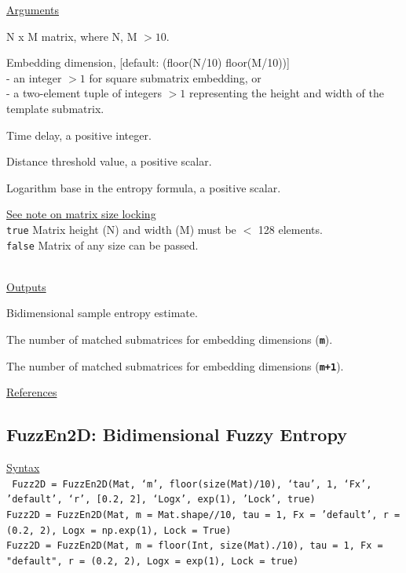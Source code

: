 \documentclass[12pt, a4paper, titlepage, openany]{book}
\begin{document}
\noindent \ul{Arguments}
\begin{description}[labelsep=1cm, labelwidth=2cm, nosep,,style=multiline,leftmargin=3cm]\footnotesize
\item[\texttt{Mat}]		N x M matrix,  where N, M $> 10$.
\item[\texttt{m}]		Embedding dimension, [default: (floor(N/10) floor(M/10))]\\
						- an integer $> 1$ for square submatrix embedding, or\\
						- a two-element tuple of integers $> 1$ representing the height and width of the template submatrix.
\item[\texttt{tau}]		Time delay, a positive integer.
\item[\texttt{r}]		Distance threshold value, a positive scalar.
\item[\texttt{Logx}]	Logarithm base in the entropy formula, a positive scalar.
\item[\texttt{Lock}]	\hyperlink{bidinote}{\ul{See note on matrix size locking}}\\
					\texttt{true} \hspace{15pt} Matrix height (N) and width (M) must be $<$ 128 elements.\\
					\texttt{false}\hspace{12pt} Matrix of any size can be passed.\\ \
\end{description}

\noindent \ul{Outputs}
\begin{description}[labelsep=1cm, labelwidth=2cm, nosep, style=multiline,leftmargin=3cm]\footnotesize
\item[\texttt{SE2D}]		Bidimensional sample entropy estimate.
\item[\texttt{Phi1}]		The number of matched submatrices for embedding dimensions (\texttt{\textbf{m}}).
\item[\texttt{Phi2}]		The number of matched submatrices for embedding dimensions (\texttt{\textbf{m+1}}).
\end{description}

\noindent \ul{References}\hspace{1cm}
\cite{Samp2D1}



\newpage
\subsection{\normalsize FuzzEn2D: \hspace{15mm} Bidimensional Fuzzy Entropy}
\noindent\ul{Syntax} \vspace{6mm} \\ \noindent \texttt{\footnotesize
Fuzz2D = FuzzEn2D(Mat, ‘m’, floor(size(Mat)/10), ‘tau’, 1, ‘Fx’, 'default', ‘r’, [0.2, 2], ‘Logx’, exp(1), 'Lock', true)\\
Fuzz2D = FuzzEn2D(Mat, m = Mat.shape//10, tau = 1, Fx = 'default', r = (0.2, 2), Logx = np.exp(1), Lock = True)\\
Fuzz2D = FuzzEn2D(Mat, m = floor(Int, size(Mat)./10), tau = 1, Fx = "default", r = (0.2, 2), Logx = exp(1), Lock = true)}
\end{document}
